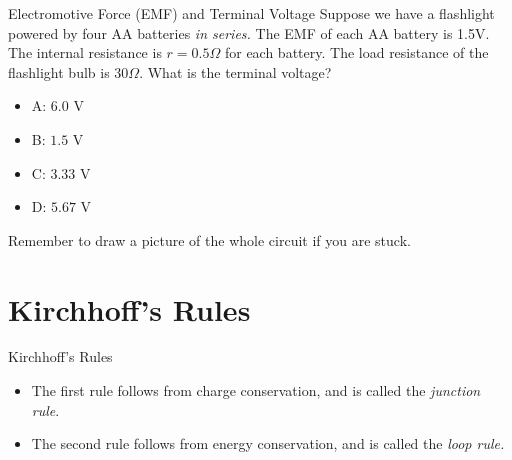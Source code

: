 \documentclass{beamer}
\begin{document}
\begin{frame}{Electromotive Force (EMF) and Terminal Voltage}
Suppose we have a flashlight powered by four AA batteries \textit{in series.}  The EMF of each AA battery is 1.5V.  The internal resistance is $r = 0.5\Omega$ for each battery.  The load resistance of the flashlight bulb is $30 \Omega$.  What is the terminal voltage?
\begin{itemize}
\item A: $6.0$ V
\item B: $1.5$ V
\item C: $3.33$ V
\item D: $5.67$ V
\end{itemize}
\footnotesize{Remember to draw a picture of the whole circuit if you are stuck.}
\end{frame}

\section{Kirchhoff's Rules}

\begin{frame}{Kirchhoff's Rules}
\small
{}
\begin{itemize}
\item The first rule follows from charge conservation, and is called the \textit{junction rule}.
\item The second rule follows from energy conservation, and is called the \textit{loop rule.}
\end{itemize}
\end{frame}
\end{document}
